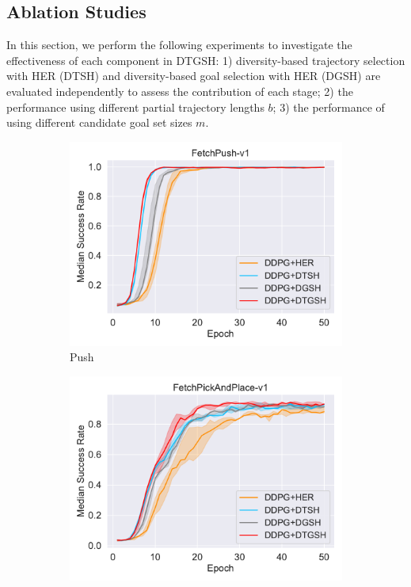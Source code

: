 \subsection{Ablation Studies}
In this section, we perform the following experiments to investigate the effectiveness of each component in DTGSH: 1) diversity-based trajectory selection with HER (DTSH) and diversity-based goal selection with HER (DGSH) are evaluated independently to assess the contribution of each stage; 2) the performance using different partial trajectory lengths $b$; 3) the performance of using different candidate goal set sizes $m$.
\begin{figure}[h]
  \begin{subfigure}[t]{0.33\textwidth}
    \includegraphics[width=\textwidth]{figures/chapter4/FetchPush-v1_ab1.pdf}
    \caption{Push}
    \label{subfig:baseline_push_ab1}
  \end{subfigure}\hfill
  \begin{subfigure}[t]{0.33\textwidth}
    \includegraphics[width=\textwidth]{figures/chapter4/FetchPickAndPlace-v1_ab1.pdf}

\end{subfigure}
\end{figure}
